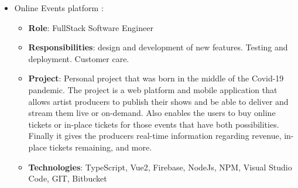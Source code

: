 \documentclass[11pt,a4paper,sans]{moderncv}        %
\begin{document}
\vspace{10mm}

  {
    \begin{itemize}
      \item Online Events platform :
        \begin{itemize}
          \item \textbf{Role}: FullStack Software Engineer 
          \item \textbf{Responsibilities}: design and development of new features. Testing and deployment. Customer care.
          \item \textbf{Project}: Personal project that was born in the middle of the Covid-19 pandemic. The project is a web platform and mobile application that allows artist producers to publish their shows and be able to deliver and stream them live or on-demand. Also enables the users to buy online tickets or in-place tickets for those events that have both possibilities. Finally it gives the producers real-time information regarding revenue, in-place tickets remaining, and more.
          \item \textbf{Technologies}: TypeScript, Vue2, Firebase, NodeJs, NPM, Visual Studio Code, GIT, Bitbucket
        \end{itemize}
    \end{itemize}
  }

\vspace{10mm}
\end{document}
